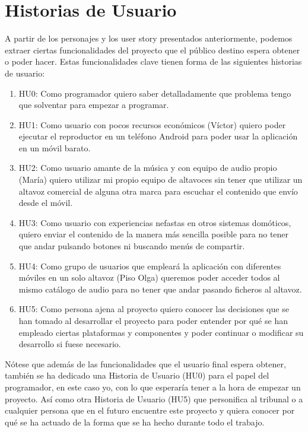 \section{Historias de Usuario}
A partir de los personajes y los user story presentados anteriormente, podemos
extraer ciertas funcionalidades del proyecto que el público destino espera
obtener o poder hacer. Estas funcionalidades clave tienen forma de las
siguientes historias de usuario:

\begin{enumerate}
    \item HU0: Como programador quiero saber detalladamente que problema tengo
    que solventar para empezar a programar.
    \item HU1: Como usuario con pocos recursos económicos (Víctor) quiero poder
    ejecutar el reproductor en un teléfono Android para poder usar la aplicación
    en un móvil barato.
    \item HU2: Como usuario amante de la música y con equipo de audio propio
    (María) quiero utilizar mi propio equipo de altavoces sin tener que utilizar
    un altavoz comercial de alguna otra marca para escuchar el contenido que
    envío desde el móvil.
    \item HU3: Como usuario con experiencias nefastas en otros sistemas
    domóticos, quiero enviar el contenido de la manera más sencilla posible para
    no tener que andar pulsando botones ni buscando menús de compartir.
    \item HU4: Como grupo de usuarios que empleará la aplicación con diferentes
    móviles en un solo altavoz (Piso Olga) queremos poder acceder todos al mismo
    catálogo de audio para no tener que andar pasando ficheros al altavoz.
    \item HU5: Como persona ajena al proyecto quiero conocer las decisiones que
    se han tomado al desarrollar el proyecto para poder entender por qué se han
    empleado ciertas plataformas y componentes y poder continuar o modificar su
    desarrollo si fuese necesario.
\end{enumerate}

Nótese que además de las funcionalidades que el usuario final espera obtener,
también se ha dedicado una Historia de Usuario (HU0) para el papel del
programador, en este caso yo, con lo que esperaría tener a la hora de empezar un
proyecto. Así como otra Historia de Usuario (HU5) que personifica al tribunal o
a cualquier persona que en el futuro encuentre este proyecto y quiera conocer
por qué se ha actuado de la forma que se ha hecho durante todo el trabajo.

